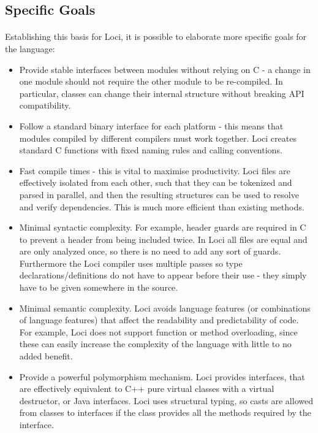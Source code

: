 \documentclass{article}
\begin{document}
\paragraph{}


\subsection{Specific Goals}

\paragraph{}
Establishing this basis for Loci, it is possible to elaborate more specific goals for the language:

\begin{itemize}
\item Provide stable interfaces between modules without relying on C - a change in one module should not require the other module to be re-compiled. In particular, classes can change their internal structure without breaking API compatibility.
\item Follow a standard binary interface for each platform - this means that modules compiled by different compilers must work together. Loci creates standard C functions with fixed naming rules and calling conventions.
\item Fast compile times - this is vital to maximise productivity. Loci files are effectively isolated from each other, such that they can be tokenized and parsed in parallel, and then the resulting structures can be used to resolve and verify dependencies. This is much more efficient than existing methods.
\item Minimal syntactic complexity. For example, header guards are required in C to prevent a header from being included twice. In Loci all files are equal and are only analyzed once, so there is no need to add any sort of guards. Furthermore the Loci compiler uses multiple passes so type declarations/definitions do not have to appear before their use - they simply have to be given somewhere in the source.
\item Minimal semantic complexity. Loci avoids language features (or combinations of language features) that affect the readability and predictability of code. For example, Loci does not support function or method overloading, since these can easily increase the complexity of the language with little to no added benefit.
\item Provide a powerful polymorphism mechanism. Loci provides interfaces, that are effectively equivalent to C++ pure virtual classes with a virtual destructor, or Java interfaces. Loci uses structural typing, so casts are allowed from classes to interfaces if the class provides all the methods required by the interface.
\end{itemize}
\end{document}
